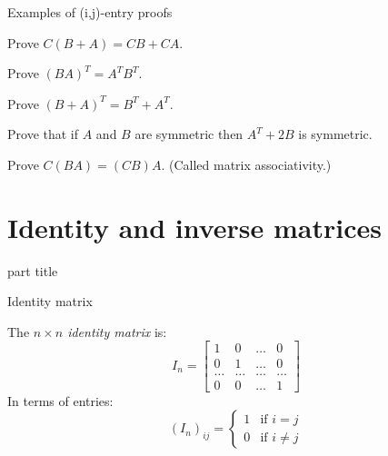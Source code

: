 \documentclass{beamer}
\begin{document}
\begin{frame} {Examples of (i,j)-entry proofs}
  \begin{example}
    Prove $C(B+A) = CB+CA$.
  \end{example}
  \begin{example}
    Prove $(BA)^T = A^TB^T$.
  \end{example}
  \begin{example}
    Prove $(B+A)^T = B^T + A^T$.
  \end{example}
  \begin{example}
    Prove that if $A$ and $B$ are symmetric then $A^T+2B$ is symmetric.
  \end{example}
  \begin{example}
    Prove $C(BA) = (CB)A$. (Called matrix associativity.)
  \end{example}
\end{frame}

\section{Identity and inverse matrices}

\begin{frame}
  \begin{beamercolorbox}[sep=12pt,center]{part title}
    \insertsection\par
  \end{beamercolorbox}
\end{frame}

\begin{frame}{Identity matrix}
  \begin{definition}
    The \emph{$n\times n$ identity matrix} is:
    \begin{equation*}
      I_n = 
      \left[
	\begin{array}{cccc}
          1 & 0 & \dots & 0\\
          0 & 1 & \dots & 0\\
          \dots & \dots & \dots & \dots\\
          0 & 0 & \dots & 1
	\end{array}
      \right]
    \end{equation*}
    In terms of entries:
    \begin{equation*}
      (I_n)_{ij} = \begin{cases}
        1 & \text{if }i=j\\
        0 & \text{if }i\neq j
      \end{cases}
    \end{equation*}
  \end{definition}
\end{frame}
\end{document}
